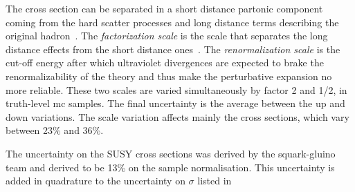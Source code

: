 The cross section can be separated in a short distance partonic component coming
from the hard scatter processes and long distance terms describing the original
hadron~\cite{FactorizationScale}. The \emph{factorization scale} is the scale
that separates the long distance effects from the short distance
ones~\cite{PerturbativeQCDHandbook}. The \emph{renormalization scale} is the
cut-off energy after which ultraviolet divergences are expected to brake the
renormalizability of the theory and thus make the perturbative expansion no more
reliable. These two scales are varied simultaneously by factor 2 and 1/2, in
truth-level \gls{mc} samples. The final uncertainty is the average between the
up and down variations. The scale variation affects mainly the cross sections,
which vary between 23\% and 36\%.

The uncertainty on the SUSY cross sections was derived by the squark-gluino team
and derived to be 13\% on the sample normalisation. This uncertainty is added in
quadrature to the uncertainty on $\sigma$ listed in
